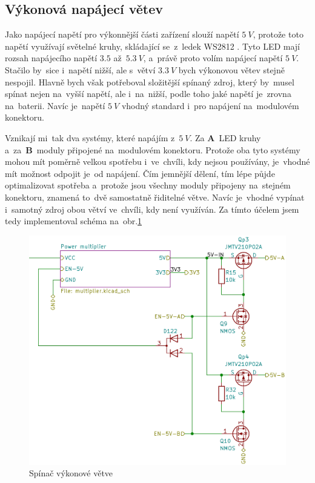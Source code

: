 \subsection{Výkonová napájecí větev}
Jako napájecí napětí pro výkonnější části zařízení slouží napětí \(5~V\), protože toto napětí využívají světelné kruhy, skládající se~z~ledek WS2812 \cite{WS2812B}.
Tyto LED mají rozsah napájecího napětí \(3.5\) až~\(5.3~V\), a~právě proto volím napájecí napětí \(5~V\).
Stačilo by~sice i~napětí nižší, ale s~větví \(3.3~V\) bych výkonovou větev stejně nespojil.
Hlavně bych však potřeboval složitější spínaný zdroj, který by~musel spínat nejen na~vyšší napětí, ale i~na~nižší, podle toho jaké napětí je~zrovna na~baterii.
Navíc je~napětí \(5~V\) vhodný standard i~pro napájení na~modulovém konektoru.

Vznikají mi~tak dva systémy, které napájím z~\(5~V\).
Za {\bf A}~LED kruhy a~za~{\bf B}~moduly připojené na~modulovém konektoru.
Protože oba tyto systémy mohou mít poměrně velkou spotřebu i~ve~chvíli, kdy nejsou používány, je~vhodné mít možnost odpojit je~od napájení.
Čím jemnější dělení, tím lépe půjde optimalizovat spotřeba a~protože jsou všechny moduly připojeny na~stejném konektoru, znamená to~dvě samostatně řiditelné větve.
Navíc je~vhodné vypínat i~samotný zdroj obou větví ve~chvíli, kdy není využíván.
Za tímto účelem jsem tedy implementoval schéma na~obr.\ref{fig:spinac_vikonove_vetve}

\begin{figure}[h!]
    \centering
    \includegraphics[width=\textwidth]{text/PraktickaCast/img/spinac_vikonove_vetve.png}
    \caption{Spínač výkonové větve}
    \label{fig:spinac_vikonove_vetve}
\end{figure}


